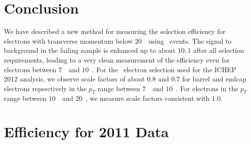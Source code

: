 \documentclass{cmspaper}
\begin{document}
\section{Conclusion}

We have described a new method for measuring the selection efficiency for electrons with transverse
momentum below $20$~\GeV\ using \ZToEEGamma\ events. The signal to background in the failing sample
is enhanced up to about $10:1$ after all selection requirements, leading to a very clean measurement
of the efficiency even for electrons between $7$~\GeV\ and $10$~\GeV . For the \HiggsToZZ\ electron
selection used for the ICHEP 2012 analysis, we observe scale factors of about $0.8$ and $0.7$ for
barrel and endcap electrons repsectively in the $p_{T}$ range between $7$~\GeV\ and $10$~\GeV. 
For electrons in the $p_{T}$ range between $10$~\GeV\ and $20$~\GeV , we measure scale factors
consistent with $1.0$. 




\appendix
\appendixpage

\section{Efficiency for 2011 Data}
\end{document}
